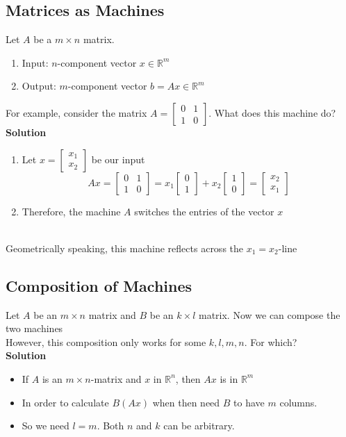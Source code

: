 \subsection{Matrices as Machines}
Let $A$ be a $m \times n$ matrix.
\begin{enumerate}
  \item Input: $n$-component vector $x \in \mathbb{R}^m$
  \item Output: $m$-component vector $b = Ax \in \mathbb{R}^m$
\end{enumerate}
For example, consider the matrix $A = \begin{bmatrix}
  0 & 1 \\
  1 & 0
\end{bmatrix}$. What does this machine do?
\\[8pt]
\textbf{Solution}
\begin{enumerate}
  \item Let $x = \begin{bmatrix}
  x_1 \\ x_2
\end{bmatrix}$ be our input
\[
  Ax = \begin{bmatrix}
    0 & 1 \\ 1 & 0
  \end{bmatrix} = x_1 \begin{bmatrix}
    0 \\ 1
  \end{bmatrix} + x_2 \begin{bmatrix}
    1 \\ 0
  \end{bmatrix} = \begin{bmatrix}
    x_2 \\ x_1
  \end{bmatrix}
\]
  \item Therefore, the machine $A$ switches the entries of the vector $x$
\end{enumerate}
\\[8pt]
Geometrically speaking, this machine reflects across the $x_1 = x_2$-line
\subsection{Composition of Machines}
Let $A$ be an $m \times n$ matrix and $B$ be an $k \times l$ matrix. Now we 
can compose the two machines 
\\[8pt]
However, this composition only works for some $k, l, m, n$. For which?
\\[8pt]
\textbf{Solution}
\begin{itemize}
  \item If $A$ is an $m \times n$-matrix and $x$ in $\mathbb{R}^n$, 
  then $Ax$ is in $\mathbb{R}^m$
  \item In order to calculate $B(Ax)$ when then need $B$ to have $m$ columns.
  \item So we need $l = m$. Both $n$ and $k$ can be arbitrary.
\end{itemize}
